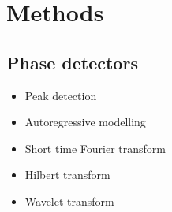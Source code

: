 \documentclass{article}
\begin{document}
\section*{Methods}

\subsection*{Phase detectors}
\begin{itemize}
\item Peak detection
\item Autoregressive modelling
\item Short time Fourier transform
\item Hilbert transform \cite{muller_estimation_2003}
\item Wavelet transform \cite{farge_wavelet_1992,torrence_practical_1998}
\end{itemize}
\end{document}
